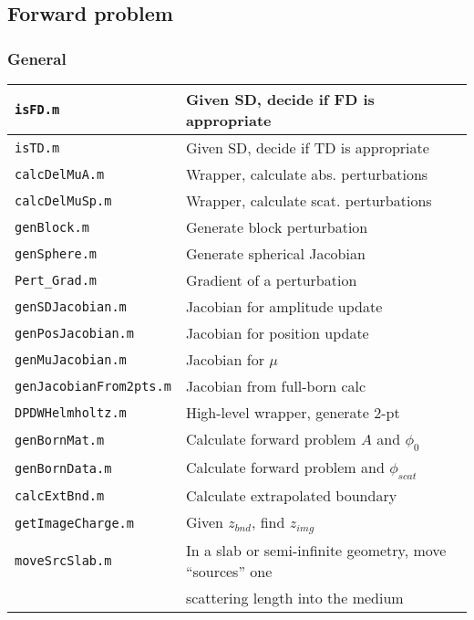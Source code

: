 \documentclass[12pt]{article}
\newcommand{\pmifile}[1]{{\tt #1}}
\begin{document}
\subsection{Forward problem}

\subsubsection{General}

\begin{tabular}{|l|l|}
\hline
\pmifile{isFD.m}                & Given SD, decide if 
		FD is appropriate \\ \hline
\pmifile{isTD.m}                & Given SD, decide if 
		TD is appropriate \\ \hline
\pmifile{calcDelMuA.m}          & Wrapper, calculate abs. 
		perturbations \\ \hline
\pmifile{calcDelMuSp.m}         & Wrapper, calculate scat. 
		perturbations \\ \hline
\pmifile{genBlock.m}            & Generate block perturbation \\ \hline
\pmifile{genSphere.m}           & Generate spherical Jacobian \\ \hline
\pmifile{Pert\_Grad.m}          & Gradient of a perturbation \\ \hline
\pmifile{genSDJacobian.m}       & Jacobian for amplitude update \\ \hline
\pmifile{genPosJacobian.m}      & Jacobian for position update \\ \hline
\pmifile{genMuJacobian.m}       & Jacobian for $\mu$ \\ \hline
\pmifile{genJacobianFrom2pts.m} & Jacobian from full-born calc \\ \hline
\pmifile{DPDWHelmholtz.m}       & High-level wrapper, generate 2-pt\\ \hline
\pmifile{genBornMat.m}          & Calculate forward problem $A$ and
					$\phi_0$ \\ \hline 
\pmifile{genBornData.m}         & Calculate forward problem and
					$\phi_{scat}$ \\ \hline 
\pmifile{calcExtBnd.m}          & Calculate extrapolated boundary \\ \hline
\pmifile{getImageCharge.m}      & Given $z_{bnd}$, find $z_{img}$ \\ \hline
\pmifile{moveSrcSlab.m} 	& In a slab or semi-infinite geometry, move 
					``sources'' one \\
                		& \quad scattering length 
					into the medium \\ \hline 
\end{tabular}
\end{document}
